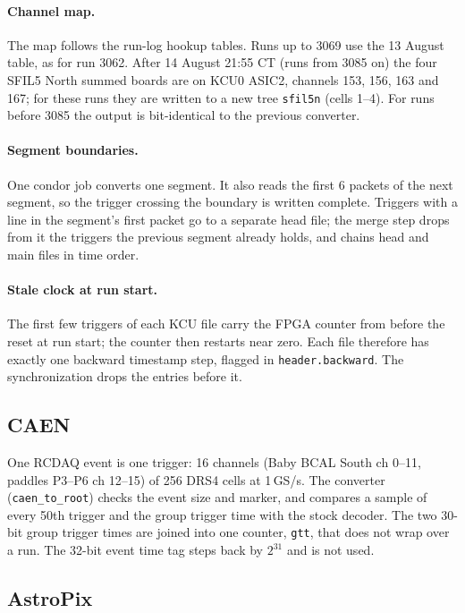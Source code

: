 \documentclass[11pt]{article}
\begin{document}
\paragraph{Channel map.} The map follows the run-log hookup tables. Runs up to 3069 use the 13 August table,
as for run 3062. After 14 August 21:55 CT (runs from 3085 on) the four SFIL5 North summed boards are on KCU0
ASIC2, channels 153, 156, 163 and 167; for these runs they are written to a new tree \texttt{sfil5n}
(cells 1--4). For runs before 3085 the output is bit-identical to the previous converter.

\paragraph{Segment boundaries.} One condor job converts one segment. It also reads the first 6 packets of
the next segment, so the trigger crossing the boundary is written complete. Triggers with a line in the
segment's first packet go to a separate head file; the merge step drops from it the triggers the previous
segment already holds, and chains head and main files in time order.

\paragraph{Stale clock at run start.} The first few triggers of each KCU file carry the FPGA counter from
before the reset at run start; the counter then restarts near zero. Each file therefore has exactly one
backward timestamp step, flagged in \texttt{header.backward}. The synchronization drops the entries before it.

\subsection*{CAEN}

One RCDAQ event is one trigger: 16 channels (Baby BCAL South ch 0--11, paddles P3--P6 ch 12--15) of 256
DRS4 cells at 1\,GS/s. The converter (\texttt{caen\_to\_root}) checks the event size and marker, and compares a
sample of every 50th trigger and the group trigger time with the stock decoder. The two 30-bit group trigger
times are joined into one counter, \texttt{gtt}, that does not wrap over a run. The 32-bit event time tag
steps back by $2^{31}$ and is not used.

\subsection*{AstroPix}
\end{document}
